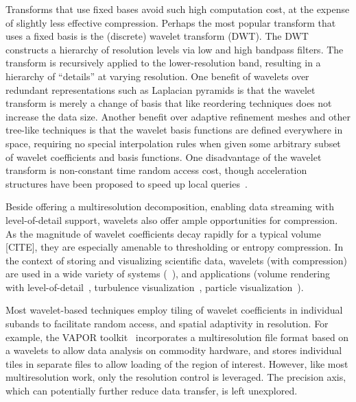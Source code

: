 Transforms that use fixed bases avoid such high computation cost, at the expense of slightly less
effective compression. Perhaps the most popular transform that uses a fixed basis is the (discrete)
wavelet transform (DWT). The DWT constructs a hierarchy of resolution levels via low and high
bandpass filters. The transform is recursively applied to the lower-resolution band, resulting in a
hierarchy of ``details'' at varying resolution. One benefit of wavelets over redundant
representations such as Laplacian pyramids is that the wavelet transform is merely a change of basis
that like reordering techniques does not increase the data size. Another benefit over adaptive
refinement meshes and other tree-like techniques is that the wavelet basis functions are defined
everywhere in space, requiring no special interpolation rules when given some arbitrary subset of
wavelet coefficients and basis functions. One disadvantage of the wavelet transform is non-constant
time random access cost, though acceleration structures have been proposed to speed up local
queries~\cite{weiss}.

Beside offering a multiresolution decomposition, enabling data streaming with level-of-detail
support, wavelets also offer ample opportunities for compression. As the magnitude of wavelet
coefficients decay rapidly for a typical volume [CITE], they are especially amenable to thresholding
or entropy compression. In the context of storing and visualizing scientific data, wavelets (with
compression) are used in a wide variety of systems
(~\cite{multires_toolkit2003,vapor2007,woodring2011}), and applications (volume rendering with
level-of-detail~\cite{wavelet-compression-interactive-vis,multires-framework,rapid-compression-volume,interactive-rendering-large-volume,multires-volume-rendering},
turbulence visualization~\cite{treib}, particle visualization~\cite{sph-octree}).

Most wavelet-based techniques employ tiling of wavelet coefficients in individual subands to
facilitate random access, and spatial adaptivity in resolution. For example, the VAPOR
toolkit~\cite{vapor2007} incorporates a multiresolution file format based on a wavelets to allow
data analysis on commodity hardware, and stores individual tiles in separate files to allow loading
of the region of interest. However, like most multiresolution work, only the resolution control is
leveraged. The precision axis, which can potentially further reduce data transfer, is left
unexplored.

